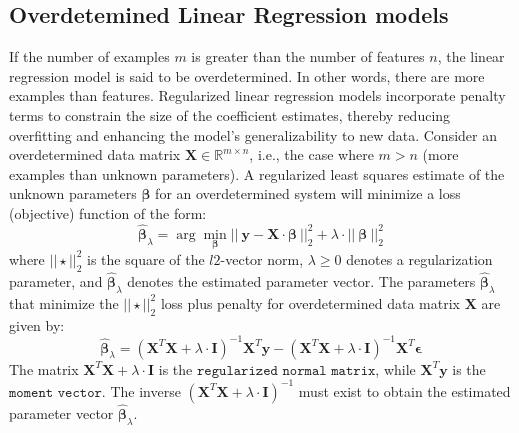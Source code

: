 \documentclass{article}[12pt]
\begin{document}
\subsection{Overdetemined Linear Regression models}
If the number of examples $m$ is greater than the number of features $n$, the linear regression model is said to be overdetermined.
In other words, there are more examples than features.  Regularized linear regression models incorporate penalty terms to constrain the size of the coefficient estimates, thereby reducing overfitting and enhancing the model's generalizability to new data. 
Consider an overdetermined data matrix $\mathbf{X}\in\mathbb{R}^{m\times{n}}$, i.e., the case where $m>n$ (more examples than unknown parameters).
A regularized least squares estimate of the unknown parameters $\mathbf{\beta}$ for an overdetermined system will minimize a loss (objective) function of the form:
\begin{equation*}
\hat{\mathbf{\beta}}_{\lambda} = \arg\min_{\mathbf{\beta}} ||~\mathbf{y} - \mathbf{X}\cdot\mathbf{\beta}~||^{2}_{2} + \lambda\cdot||~\mathbf{\beta}~||^{2}_{2}
\end{equation*}
where $||\star||^{2}_{2}$ is the square of the $l2$-vector norm, $\lambda\geq{0}$ denotes a regularization parameter, and $\hat{\mathbf{\beta}}_{\lambda}$ denotes the estimated parameter vector. 
The parameters $\hat{\mathbf{\beta}}_{\lambda}$ that minimize the $||\star||^{2}_{2}$ loss plus penalty for overdetermined data matrix $\mathbf{X}$ are given by:
\begin{equation*}
\hat{\mathbf{\beta}}_{\lambda} = \left(\mathbf{X}^{T}\mathbf{X}+\lambda\cdot\mathbf{I}\right)^{-1}\mathbf{X}^{T}\mathbf{y} - \left(\mathbf{X}^{T}\mathbf{X}+\lambda\cdot\mathbf{I}\right)^{-1}\mathbf{X}^{T}\mathbf{\epsilon}
\end{equation*}
The matrix $\mathbf{X}^{T}\mathbf{X}+\lambda\cdot\mathbf{I}$ is the $\texttt{regularized normal matrix}$, while $\mathbf{X}^{T}\mathbf{y}$ is the $\texttt{moment vector}$. 
The inverse $\left(\mathbf{X}^{T}\mathbf{X}+\lambda\cdot\mathbf{I}\right)^{-1}$ must exist to obtain the estimated parameter vector $\hat{\mathbf{\beta}}_{\lambda}$.
\end{document}
